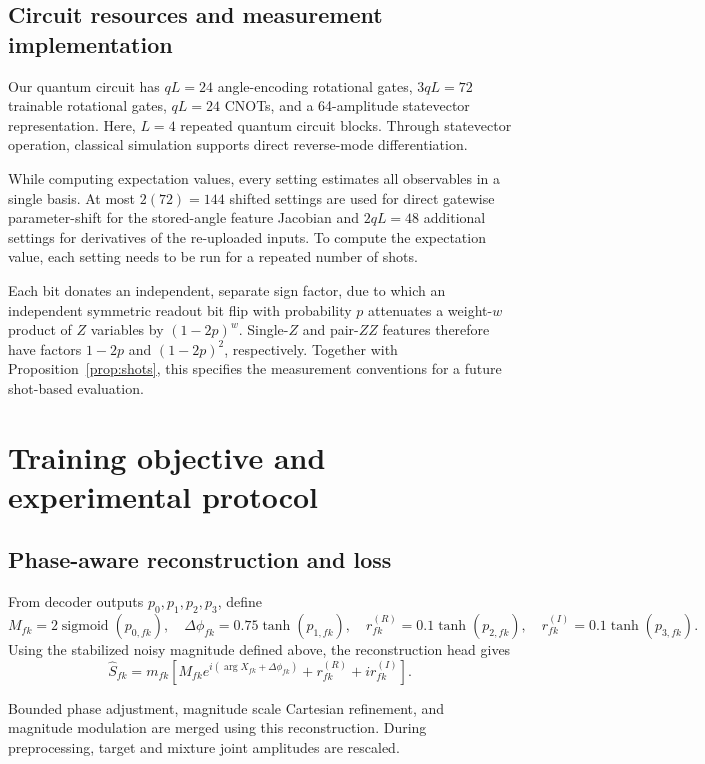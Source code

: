 \documentclass[10pt,a4paper]{article}
\begin{document}
\subsection{Circuit resources and measurement implementation}
Our quantum circuit has $qL=24$ angle-encoding rotational gates, $3qL=72$ trainable rotational gates, $qL=24$ CNOTs, and a 64-amplitude statevector representation. Here, $L=4$ repeated quantum circuit blocks. Through statevector operation, classical simulation supports direct reverse-mode differentiation. 

While computing expectation values, every setting estimates all observables in a single basis. At most $2(72)=144$ shifted settings are used for direct gatewise parameter-shift for the stored-angle feature Jacobian and $2qL=48$ additional settings for derivatives of the re-uploaded inputs. To compute the expectation value, each setting needs to be run for a repeated number of shots. 

Each bit donates an independent, separate sign factor, due to which an independent symmetric readout bit flip with probability $p$ attenuates a weight-$w$ product of $Z$ variables by $(1-2p)^w$. Single-$Z$ and pair-$ZZ$ features therefore have factors $1-2p$ and $(1-2p)^2$, respectively. Together with Proposition~\ref{prop:shots}, this specifies the measurement conventions for a future shot-based evaluation.



\section{Training objective and experimental protocol}
\subsection{Phase-aware reconstruction and loss}
From decoder outputs $p_0,p_1,p_2,p_3$, define
\begin{equation}
M_{fk}=2\operatorname{sigmoid}(p_{0,fk}),\quad
\Delta\phi_{fk}=0.75\tanh(p_{1,fk}),\quad
r^{(R)}_{fk}=0.1\tanh(p_{2,fk}),\quad
r^{(I)}_{fk}=0.1\tanh(p_{3,fk}).
\end{equation}
Using the stabilized noisy magnitude defined above, the reconstruction head gives
\begin{equation}\label{eq:head}
\widehat S_{fk}=m_{fk}\left[M_{fk}e^{i(\arg X_{fk}+\Delta\phi_{fk})}+r^{(R)}_{fk}+i r^{(I)}_{fk}\right].
\end{equation}

Bounded phase adjustment, magnitude scale Cartesian refinement, and magnitude modulation are merged using this reconstruction. During preprocessing, target and mixture joint amplitudes are rescaled. 
\end{document}
